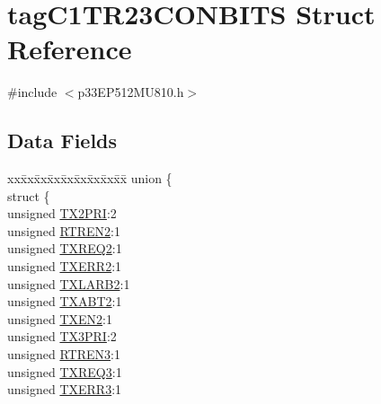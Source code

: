 \hypertarget{structtag_c1_t_r23_c_o_n_b_i_t_s}{}\section{tag\+C1\+T\+R23\+C\+O\+N\+B\+I\+TS Struct Reference}
\label{structtag_c1_t_r23_c_o_n_b_i_t_s}


{\ttfamily \#include $<$p33\+E\+P512\+M\+U810.\+h$>$}

\subsection*{Data Fields}
\begin{DoxyCompactItemize}
\item 
\begin{tabbing}
xx\=xx\=xx\=xx\=xx\=xx\=xx\=xx\=xx\=\kill
union \{\\
\>struct \{\\
\>\>unsigned \hyperlink{structtag_c1_t_r23_c_o_n_b_i_t_s_a3a1399b0b76cd4a585b343e955264ede}{TX2PRI}:2\\
\>\>unsigned \hyperlink{structtag_c1_t_r23_c_o_n_b_i_t_s_ae493e6bcad8d0465a07a529faacd0d85}{RTREN2}:1\\
\>\>unsigned \hyperlink{structtag_c1_t_r23_c_o_n_b_i_t_s_ab6c9ac0d87cabb9c2ec33ae25d6597a7}{TXREQ2}:1\\
\>\>unsigned \hyperlink{structtag_c1_t_r23_c_o_n_b_i_t_s_aebf5b60b8ac70c2b840460fabd90173d}{TXERR2}:1\\
\>\>unsigned \hyperlink{structtag_c1_t_r23_c_o_n_b_i_t_s_a8c1902321c244b57958213e7ff60c1fe}{TXLARB2}:1\\
\>\>unsigned \hyperlink{structtag_c1_t_r23_c_o_n_b_i_t_s_ae72379093b477b247c357f11e819d3e1}{TXABT2}:1\\
\>\>unsigned \hyperlink{structtag_c1_t_r23_c_o_n_b_i_t_s_a1d4eeb7e60c688264b0776a8f70d6d86}{TXEN2}:1\\
\>\>unsigned \hyperlink{structtag_c1_t_r23_c_o_n_b_i_t_s_a4223418ab53b7f23cff26678911b9c43}{TX3PRI}:2\\
\>\>unsigned \hyperlink{structtag_c1_t_r23_c_o_n_b_i_t_s_afcb7c827eacc4aca6fbe5071b256589a}{RTREN3}:1\\
\>\>unsigned \hyperlink{structtag_c1_t_r23_c_o_n_b_i_t_s_a47e1fc4fb58ee84e505cba762a6d1acf}{TXREQ3}:1\\
\>\>unsigned \hyperlink{structtag_c1_t_r23_c_o_n_b_i_t_s_a6e47904e946a63d8075f4210004e297f}{TXERR3}:1\\

\end{tabbing}
\end{DoxyCompactItemize}
